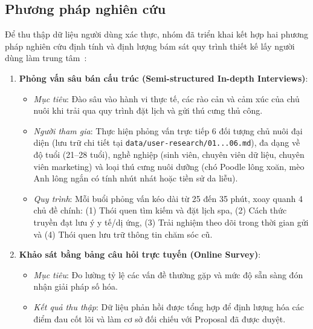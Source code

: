 \subsection{Phương pháp nghiên cứu}
Để thu thập dữ liệu người dùng xác thực, nhóm đã triển khai kết hợp hai phương pháp nghiên cứu định tính và định lượng bám sát quy trình thiết kế lấy người dùng làm trung tâm~\cite{Norman2013, Cooper2004}:
\begin{enumerate}
    \item \textbf{Phỏng vấn sâu bán cấu trúc (Semi-structured In-depth Interviews)}:
    \begin{itemize}
        \item \textit{Mục tiêu}: Đào sâu vào hành vi thực tế, các rào cản và cảm xúc của chủ nuôi khi trải qua quy trình đặt lịch và gửi thú cưng thủ công.
        \item \textit{Người tham gia}: Thực hiện phỏng vấn trực tiếp 6 đối tượng chủ nuôi đại diện (lưu trữ chi tiết tại \texttt{data/user-research/01...06.md}), đa dạng về độ tuổi (21--28 tuổi), nghề nghiệp (sinh viên, chuyên viên dữ liệu, chuyên viên marketing) và loại thú cưng nuôi dưỡng (chó Poodle lông xoăn, mèo Anh lông ngắn có tính nhút nhát hoặc tiền sử da liễu).
        \item \textit{Quy trình}: Mỗi buổi phỏng vấn kéo dài từ 25 đến 35 phút, xoay quanh 4 chủ đề chính: (1) Thói quen tìm kiếm và đặt lịch spa, (2) Cách thức truyền đạt lưu ý y tế/dị ứng, (3) Trải nghiệm theo dõi trong thời gian gửi và (4) Thói quen lưu trữ thông tin chăm sóc cũ.
    \end{itemize}
    \item \textbf{Khảo sát bằng bảng câu hỏi trực tuyến (Online Survey)}:
    \begin{itemize}
        \item \textit{Mục tiêu}: Đo lường tỷ lệ các vấn đề thường gặp và mức độ sẵn sàng đón nhận giải pháp số hóa.
        \item \textit{Kết quả thu thập}: Dữ liệu phản hồi được tổng hợp để định lượng hóa các điểm đau cốt lõi và làm cơ sở đối chiếu với Proposal đã được duyệt.
    \end{itemize}
\end{enumerate}

